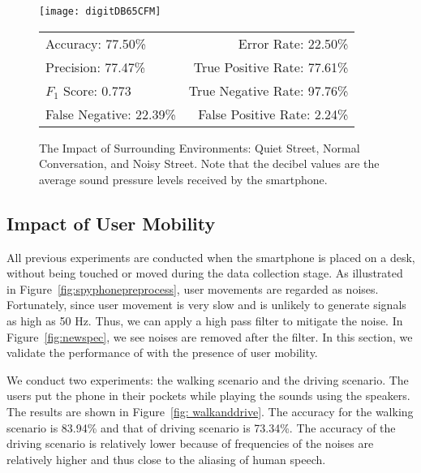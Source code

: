 \begin{landscape}
\begin{figure}[!h]
\begin{minipage}[c]{.33\linewidth}
			\centering
			\texttt{[image: digitDB65CFM]}
			\tiny
			\begin{tabular}{lr}
				\toprule
				Accuracy: 77.50\% & \hspace{-.00in} Error Rate: 22.50\% \\
				Precision: 77.47\% & \hspace{-.00in} True Positive Rate: 77.61\% \\
				$F_1$ Score: 0.773 & \hspace{-.00in} True Negative Rate: 97.76\% \\
				False Negative: 22.39\% & \hspace{-.00in} False Positive Rate: 2.24\% \\
				\bottomrule
			\end{tabular}
		\end{minipage}
		\caption[Impact of Surrounding Environments.]{The Impact of Surrounding Environments: Quiet Street, Normal Conversation, and Noisy Street. Note that the decibel values are the average sound pressure levels received by the smartphone. }
		\label{fig:noisetestresult}
	\end{figure}
\end{landscape}


\subsection{Impact of User Mobility}\label{sec:impact:move}
All previous experiments are conducted when the smartphone is placed on a desk, without being touched or moved during the data collection stage. As illustrated in Figure~\ref{fig:spyphonepreprocess}, user movements are regarded as noises. Fortunately, since user movement is very slow and is unlikely to generate signals as high as 50 Hz. Thus, we can apply a high pass filter to mitigate the noise. In Figure~\ref{fig:newspec}, we see noises are removed after the filter. In this section, we validate the performance of {\systemName} with the presence of user mobility. 

We conduct two experiments: the walking scenario and the driving scenario. The users put the phone in their pockets while playing the sounds using the speakers. The results are shown in Figure~\ref{fig: walkanddrive}. The accuracy for the walking scenario is 83.94\% and that of driving scenario is 73.34\%. The accuracy of the driving scenario is relatively lower because of frequencies of the noises are relatively higher and thus close to the aliasing of human speech.

